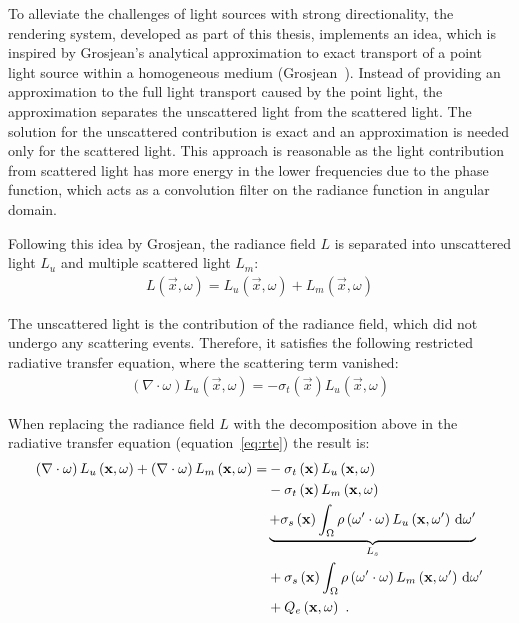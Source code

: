 To alleviate the challenges of light sources with strong directionality, the rendering system, developed as part of this thesis, implements an idea, which is inspired by Grosjean’s analytical approximation to exact transport of a point light source within a homogeneous medium (Grosjean~\cite{Grosjean56}). Instead of providing an approximation to the full light transport caused by the point light, the approximation separates the unscattered light from the scattered light. The solution for the unscattered contribution is exact and an approximation is needed only for the scattered light. This approach is reasonable as the light contribution from scattered light has more energy in the lower frequencies due to the phase function, which acts as a convolution filter on the radiance function in angular domain.

Following this idea by Grosjean, the radiance field $L$ is separated into unscattered light $L_{u}$ and multiple scattered light $L_m$:
\begin{align}
L\left(\vec{x}, \omega\right) = 
L_u\left(\vec{x}, \omega\right)
+L_m\left(\vec{x}, \omega\right)
\end{align}

The unscattered light is the contribution of the radiance field, which did not undergo any scattering events. Therefore, it satisfies the following restricted radiative transfer equation, where the scattering term vanished:
\begin{align}
\left(\nabla\cdot\omega\right)L_u\left(\vec{x}, \omega \right)
=
-\sigma_t\left(\vec{x}\right) L_u\left(\vec{x}, \omega \right)
\label{eq:restricted_rte}
\end{align}


When replacing the radiance field $L$ with the decomposition above in the radiative transfer equation (equation~\ref{eq:rte}) the result is:
\begin{align}
\left(\nabla\cdot\omega\right)L_u\left(\mathbf{x}, \omega \right)
+\left(\nabla\cdot\omega\right)L_m\left(\mathbf{x}, \omega \right)
=&
-\sigma_t\left(\mathbf{x}\right) L_u\left(\mathbf{x}, \omega \right)
\nonumber\\
&
-\sigma_t\left(\mathbf{x}\right) L_m\left(\mathbf{x}, \omega \right)\nonumber\\
&
\underbrace
{
+\sigma_s\left(\mathbf{x}\right) \int_{\Omega}
{
\rho\left(\omega'\cdot\omega\right)L_u\left(\mathbf{x}, \omega' \right)\,\mathrm{d}\omega'
}
}_{L_s}
\nonumber\\
&
+\sigma_s\left(\mathbf{x}\right) \int_{\Omega}
{
\rho\left(\omega'\cdot\omega\right)L_m\left(\mathbf{x}, \omega' \right)\,\mathrm{d}\omega'
}
\nonumber
\\
&
+Q_e\left(\mathbf{x}, \omega\right)
\nonumber
\  .
\end{align}

